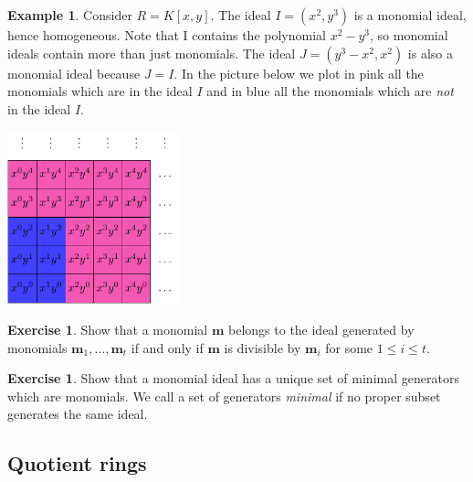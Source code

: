 \documentclass[11pt]{amsart}
\def\bm{\mathbf{m}}
\theoremstyle{plain} %
\theoremstyle{definition}
\newtheorem{ex}[thm]{Example}
\newtheorem{exer}[thm]{Exercise}
\theoremstyle{remark}
\numberwithin{equation}{section}  %
\begin{document}
\begin{ex} Consider $R = K[x,y]$. The ideal $I = (x^2, y^3)$ is a monomial ideal, hence homogeneous. Note that I contains the polynomial $x^2 - y^3$, so monomial ideals contain more than just monomials. 
The ideal $J = (y^3-x^2, x^2)$ is also a monomial ideal because  $J=I$. In the picture below we plot in pink all the monomials which are in the ideal $I$ and in blue all the monomials which are {\em not} in the ideal $I$.
\begin{center}
	\includegraphics[height=5cm]{Pictures/<x^2,y^3>.pdf}
\end{center}
\end{ex}

\begin{tcolorbox}[reset]
\begin{exer}
Show that a monomial $\bm$ belongs to the ideal generated by monomials $\bm_1,\ldots, \bm_t$ if and only if  $\bm$ is divisible by $\bm_i$ for some $1\leq i\leq t$.
\end{exer}
\end{tcolorbox}

\begin{tcolorbox}[reset]
\begin{exer}\label{ex:monomialmingens}
Show that a monomial ideal has a unique set of minimal generators which are monomials. We call a set of generators {\em minimal} if no proper subset generates the same ideal.
\end{exer}
\end{tcolorbox}

\subsection{Quotient rings}
\end{document}
